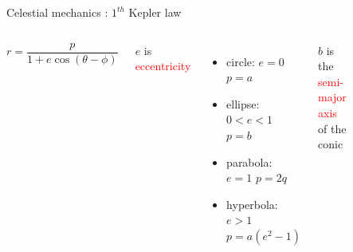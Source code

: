 \documentclass{beamer}
\begin{document}
\begin{frame}{Celestial mechanics \cite{murray1999solar}: $1^{th}$ Kepler law}
\begin{columns}
\begin{equation}
r=\dfrac{p}{1+e\cos(\theta-\phi)}
\end{equation}


\begin{center}
$e$ is \textcolor{red}{eccentricity}
\end{center}

\begin{itemize}
\item circle:  $e=0$ \quad $p=a$
\item ellipse: $0<e<1$ \quad $p=b$
\item parabola: $e=1$ \quad $p=2q$
\item hyperbola: $e>1$ \quad $p=a(e^{2}-1)$
\end{itemize}
\begin{center}
$b$ is the  \textcolor{red}{semi-major axis} of the conic
\end{center}
\begin{figure}[h]
\begin{center}
\includegraphics[width=\textwidth]{Pic/Conics.png}
\caption{\cite{murray1999solar}}
\label{Area_dynamics}
\end{center}
\end{figure}

\end{columns}
\end{frame}
\end{document}
